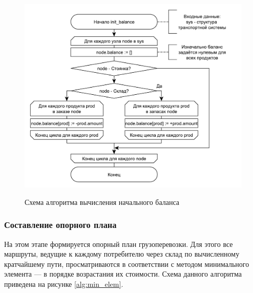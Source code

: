 \pagebreak
\begin{figure}[h]
	\begin{center}
		{\includegraphics[scale=0.7, angle=0, page=1]{img/init_balance.pdf}}
		\caption{Схема алгоритма вычисления начального баланса}
		\label{alg:balance}
	\end{center}
\end{figure}

\subsubsection{Составление опорного плана}
На этом этапе формируется опорный план грузоперевозки. Для этого все маршруты, ведущие к каждому потребителю через склад по вычисленному \, кратчайшему пути, просматриваются в соответствии с методом минимального элемента --- в порядке возрастания их стоимости. Схема данного алгоритма приведена на рисунке \ref{alg:min_elem}.


